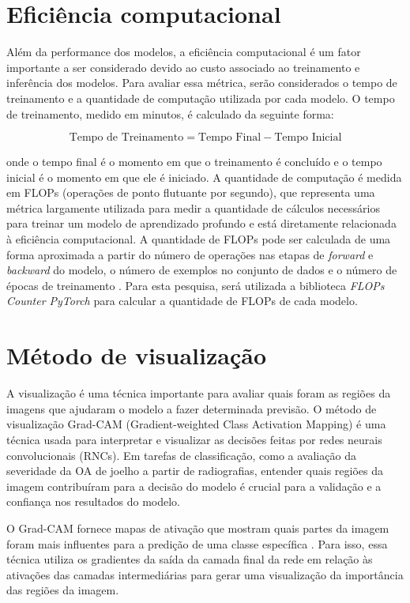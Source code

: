 \section{Eficiência computacional}

Além da performance dos modelos, a eficiência computacional é um fator importante a ser considerado devido ao custo associado ao treinamento e inferência dos modelos. Para avaliar essa métrica, serão considerados o tempo de treinamento e a quantidade de computação utilizada por cada modelo. O tempo de treinamento, medido em minutos, é calculado da seguinte forma:

\begin{equation}
    \text{Tempo de Treinamento} = \text{Tempo Final} - \text{Tempo Inicial}
\end{equation}

onde o tempo final é o momento em que o treinamento é concluído e o tempo inicial é o momento em que ele é iniciado. A quantidade de computação é medida em FLOPs (operações de ponto flutuante por segundo), que representa uma métrica largamente utilizada para medir a quantidade de cálculos necessários para treinar um modelo de aprendizado profundo e está diretamente relacionada à eficiência computacional. A quantidade de FLOPs pode ser calculada de uma forma aproximada a partir do número de operações nas etapas de \textit{forward} e \textit{backward} do modelo, o número de exemplos no conjunto de dados e o número de épocas de treinamento \cite{Lohn2022}. Para esta pesquisa, será utilizada a biblioteca \textit{FLOPs Counter PyTorch} \cite{ptflops} para calcular a quantidade de FLOPs de cada modelo.

\section{Método de visualização}

A visualização é uma técnica importante para avaliar quais foram as regiões da imagens que ajudaram o modelo a fazer determinada previsão. O método de visualização Grad-CAM (Gradient-weighted Class Activation Mapping) é uma técnica usada para interpretar e visualizar as decisões feitas por redes neurais convolucionais (RNCs). Em tarefas de classificação, como a avaliação da severidade da OA de joelho a partir de radiografias, entender quais regiões da imagem contribuíram para a decisão do modelo é crucial para a validação e a confiança nos resultados do modelo.

O Grad-CAM fornece mapas de ativação que mostram quais partes da imagem foram mais influentes para a predição de uma classe específica \cite{Selvaraju2016}. Para isso, essa técnica utiliza os gradientes da saída da camada final da rede em relação às ativações das camadas intermediárias para gerar uma visualização da importância das regiões da imagem.


